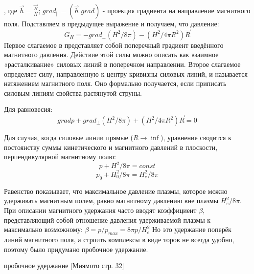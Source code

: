 \documentclass[10pt, a4paper]{article}
\begin{document}
, где $\vec h= \frac{\vec H}{H}$; $grad_{||}=(\vec h \; grad)$ - проекция градиента на направление магнитного поля. Подставляем в предыдущее выражение и получаем, что давление:
\begin{equation}
	\label{eq.Disp14.1.5}
 G_H=-grad_{\perp}(H^{2}/8\pi)-(H^{2}/4\pi R^{2})\vec R
\end{equation}
Первое слагаемое в представляет собой поперечный градиент введённого магнитного давления. Действие этой силы можно описать как взаимное «расталкивание» силовых линий в поперечном направлении. Второе слагаемое определяет силу, направленную к центру кривизны силовых линий, и называется натяжением магнитного поля. Оно формально получается, если приписать силовым линиям свойства растянутой струны.

Для равновесия: 
\begin{equation}
	\label{eq.Disp14.1.6}
 grad p + grad_{\perp}(H^{2}/8\pi)+(H^{2}/4\pi R^{2})\vec R =0
\end{equation}

Для случая, когда силовые линии прямые ($R\rightarrow \inf $), уравнение сводится к постоянству суммы кинетического и магнитного давлений в плоскости, перпендикулярной магнитному полю:
\begin{equation}
	\label{eq.Disp14.1.7}
p + H^{2}/8\pi=const
\end{equation}
\begin{equation}
	\label{eq.Disp14.1.8}
p_0 + H_{0}^{2}/8\pi=H_{e}^{2}/8\pi
\end{equation}

Равенство показывает, что максимальное давление плазмы, которое можно удерживать магнитным полем, равно магнитному давлению вне плазмы $H_{e}^{2}/8\pi$. При описании магнитного удержания часто вводят коэффициент $\beta$, представляющий собой
отношение давления удерживаемой плазмы к максимально возможному: $\beta=p/p_{max}=8\pi p/H_{e}^{2}$
Но это удержание поперёк линий магнитного поля, а строить комплексы в виде торов не всегда удобно, поэтому было придумано пробочное удержание.

пробочное удержание [Миямото стр. 32]
\end{document}
